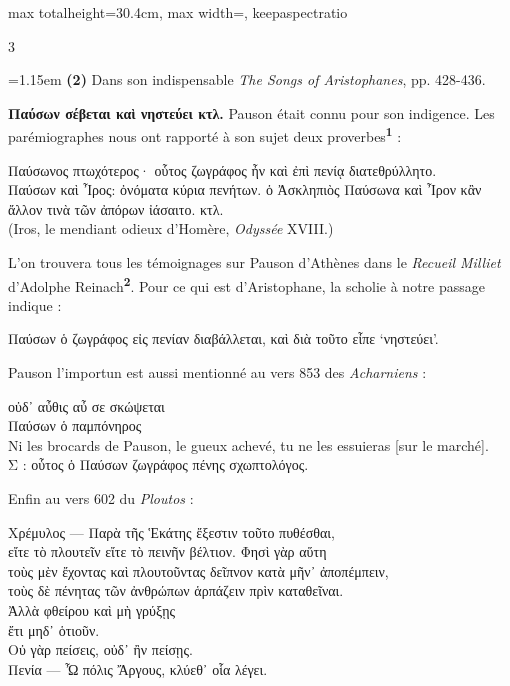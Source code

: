 \documentclass[11pt,twoside]{book}
\newcommand{\italique}[1]{\textit{#1}}
\newcommand{\citComm}[1]{\begin{quoting}[vskip=0.4pt,leftmargin=0.7em,rightmargin=0.2em]#1\end{quoting}}
\newcommand{\marqueur}[1]{\textsuperscript{\color{rubricRed}\textbf{#1}}}
\begin{document}
\begin{adjustbox}{max totalheight=30.4cm, max width=\textwidth, keepaspectratio}
\begin{minipage}{\textwidth}
{\begin{multicols}{3}
\par\vspace{1.5pt}
\noindent\hangindent=1.15em {\color{sepiaNote}\textbf{(2)}} Dans son indispensable \italique{The Songs of Aristophanes}, pp. 428-436.
\par\vspace{1.5pt}
 \textbf{Παύσων σέβεται καὶ νηστεύει κτλ.} Pauson était connu pour son indigence. Les parémiographes nous ont rapporté à son sujet deux proverbes\marqueur{1} :
\citComm{Παύσωνος πτωχότερος· οὗτος ζωγράφος ἦν καὶ ἐπὶ πενίᾳ διατεθρύλλητο.\\
Παύσων καὶ Ἶρος: ὀνόματα κύρια πενήτων. ὁ Ἀσκληπιὸς Παύσωνα καὶ Ἶρον κἂν ἄλλον τινὰ τῶν ἀπόρων ἰάσαιτο. κτλ.\\
(Iros, le mendiant odieux d'Homère, \italique{Odyssée} XVIII.)}
\par\vspace{1.5pt}
\noindent L'on trouvera tous les témoignages sur Pauson d'Athènes dans le \italique{Recueil Milliet} d'Adolphe Reinach\marqueur{2}. Pour ce qui est d'Aristophane, la scholie à notre passage indique :
\citComm{Παύσων ὁ ζωγράφος εἰς πενίαν διαβάλλεται, καὶ διὰ τοῦτο εἶπε `νηστεύει'.}
\par\vspace{1.5pt}
\noindent Pauson l'importun est aussi mentionné au vers 853 des \italique{Acharniens} :
\citComm{οὐδ᾽ αὖθις αὖ σε σκώψεται\\
Παύσων ὁ παμπόνηρος\\
Ni les brocards de Pauson, le gueux achevé, tu ne les essuieras [sur le marché].\\
Σ : οὗτος ὁ Παύσων ζωγράφος πένης σχωπτολόγος.}
\par\vspace{1.5pt}
\noindent Enfin au vers 602 du \italique{Ploutos} :
\citComm{Χρέμυλος --- Παρὰ τῆς Ἑκάτης ἔξεστιν τοῦτο πυθέσθαι,\\
εἴτε τὸ πλουτεῖν εἴτε τὸ πεινῆν βέλτιον. Φησὶ γὰρ αὕτη\\
τοὺς μὲν ἔχοντας καὶ πλουτοῦντας δεῖπνον κατὰ μῆν᾽ ἀποπέμπειν,\\
τοὺς δὲ πένητας τῶν ἀνθρώπων ἁρπάζειν πρὶν καταθεῖναι.\\
Ἀλλὰ φθείρου καὶ μὴ γρύξῃς\\
ἔτι μηδ᾽ ὁτιοῦν.\\
Οὐ γὰρ πείσεις, οὐδ᾽ ἢν πείσῃς.\\
Πενία --- Ὦ πόλις Ἄργους, κλύεθ᾽ οἷα λέγει.\\
}
\end{multicols}}
\end{minipage}
\end{adjustbox}
\end{document}
